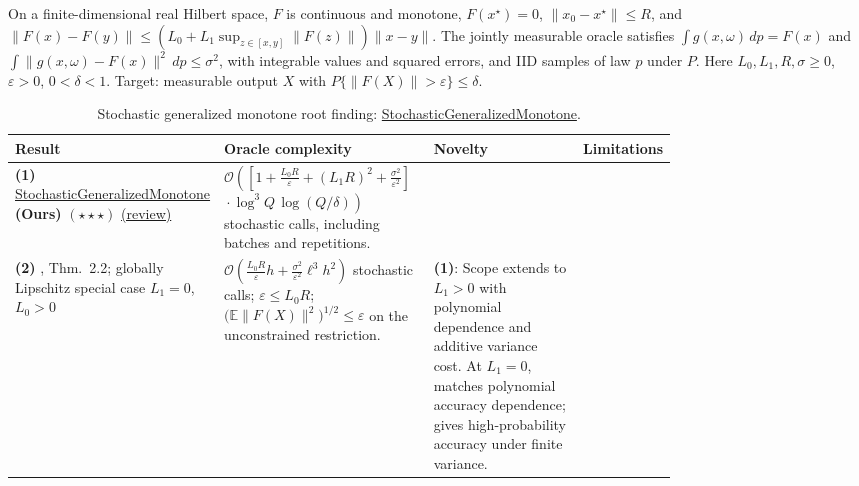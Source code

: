 \begin{table}[tp]
\centering
\caption{Stochastic generalized monotone root finding: \href{https://github.com/k3nfalt/longtails/blob/main/LongTails/Setups/StochasticGeneralizedMonotone.lean}{StochasticGeneralizedMonotone}.}\label{tab:StochasticGeneralizedMonotone}
\parbox{\linewidth}{\footnotesize On a finite-dimensional real Hilbert space, $F$ is continuous and monotone, $F(x^\star)=0$, $\|x_0-x^\star\|\le R$, and $\|F(x)-F(y)\|\le(L_0+L_1\sup_{z\in[x,y]}\|F(z)\|)\|x-y\|$. The jointly measurable oracle satisfies $\int g(x,\omega)\,dp=F(x)$ and $\int\|g(x,\omega)-F(x)\|^2\,dp\le\sigma^2$, with integrable values and squared errors, and IID samples of law $p$ under $P$. Here $L_0,L_1,R,\sigma\ge0$, $\varepsilon>0$, $0<\delta<1$. Target: measurable output $X$ with $P\{\|F(X)\|>\varepsilon\}\le\delta$.}\par\smallskip
\begin{threeparttable}
\footnotesize
\setlength{\tabcolsep}{4pt}\renewcommand{\arraystretch}{1.25}
\begin{tabularx}{\linewidth}{@{}>{\raggedright\arraybackslash}p{0.20\linewidth}>{\raggedright\arraybackslash}p{0.32\linewidth}>{\raggedright\arraybackslash}p{0.25\linewidth}>{\raggedright\arraybackslash}X@{}}
\toprule
\textbf{Result} & \textbf{Oracle complexity} & \textbf{Novelty} & \textbf{Limitations} \\
\midrule
\textbf{(1)} \href{https://github.com/k3nfalt/longtails/blob/main/LongTails/Theorems/StochasticGeneralizedMonotone.lean}{Stochastic\allowbreak Generalized\allowbreak Monotone} \textbf{(Ours)} $(\star\star\star)$ \href{https://github.com/k3nfalt/longtails/blob/main/scripts/reviews/StochasticGeneralizedMonotone.md}{(review)}
& $\mathcal{O}\!\left(\left[1+\frac{L_0R}{\varepsilon}+(L_1R)^2+\frac{\sigma^2}{\varepsilon^2}\right]\right.$\newline
$\left.{}\cdot\log^3 Q\,\log(Q/\delta)\right)$ stochastic calls, including batches and repetitions.
& & \\
\midrule[1.2pt]
\textbf{(2)} \citep{sgmJiLanZhu2026v1}, Thm.~2.2; globally Lipschitz special case $L_1=0$, $L_0>0$
& $\mathcal{O}\!\left(\frac{L_0R}{\varepsilon}h+\frac{\sigma^2}{\varepsilon^2}\ell^3h^2\right)$ stochastic calls; $\varepsilon\le L_0R$; $\bigl(\mathbb E\|F(X)\|^2\bigr)^{1/2}\le\varepsilon$ on the unconstrained restriction.
& \textbf{(1)}: Scope extends to $L_1>0$ with polynomial dependence and additive variance cost. At $L_1=0$, matches polynomial accuracy dependence; gives high-probability accuracy under finite variance.

\end{tabularx}
\end{threeparttable}
\end{table}
